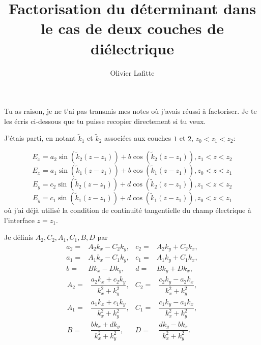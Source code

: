 \documentclass{amsart}
\begin{document}
\title{Factorisation du déterminant dans le cas de deux couches de diélectrique}


\author{Olivier Lafitte}
\address{LAGA, Institut Galil\'ee\\
Universit\'e Paris 13\\
Sorbonne Paris Cit\'e
99, avenue J.B. Cl\'ement\\
93430 Villetaneuse \\
France}
 

Tu as raison, je ne t'ai pas transmis mes notes où j'avais réussi à factoriser. Je te les écris ci-dessous que tu puisse recopier directement si tu veux.

\newcommand{\kk}{\tilde{k}}
\renewcommand{\frac}{\dfrac}

J'étais parti, en notant \(\kk_1\) et \(\kk_2\) associées aux couches \(1\) et \(2\), \(z_0<z_1<z_2\):

\[E_x=a_2\sin(\kk_2(z-z_1))+b\cos(\kk_2(z-z_1)), z_1<z<z_2\]
\[E_x=a_1\sin(\kk_1(z-z_1))+b\cos(\kk_1(z-z_1)), z_0<z<z_1\]
\[E_y=c_2\sin(\kk_2(z-z_1))+d\cos(\kk_2(z-z_1)), z_1<z<z_2\]
\[E_y=c_1\sin(\kk_1(z-z_1))+d\cos(\kk_1(z-z_1)), z_0<z<z_1\]
où j'ai déjà utilisé la condition de continuité tangentielle du champ électrique à l'interface \(z=z_1\).

Je définis \(A_2,C_2, A_1, C_1, B, D\) par
\begin{align*}
a_2 ={}& A_2k_x - C_2k_y, & c_2 ={}& A_2k_y + C_2 k_x,
\\
a_1 ={}& A_1k_x - C_1k_y, & c_1 ={}& A_1k_y + C_1 k_x,
\\
b ={}& Bk_x - Dk_y, & d ={}& Bk_y + D k_x,
\end{align*}
\begin{align*}
A_2 ={}& \frac{a_2 k_x + c_2 k_y}{k_x^2 + k_y^2}, & C_2 ={}& \frac{c_2 k_y - a_2 k_x}{k_x^2 + k_y^2},
\\
A_1 ={}& \frac{a_1 k_x + c_1 k_y}{k_x^2 + k_y^2}, & C_1 ={}& \frac{c_1 k_y - a_1 k_x}{k_x^2 + k_y^2},
\\
B ={}& \frac{b k_x + d k_y}{k_x^2 + k_y^2}, & D ={}& \frac{d k_y - b k_x}{k_x^2 + k_y^2}.
\end{align*}
\end{document}
